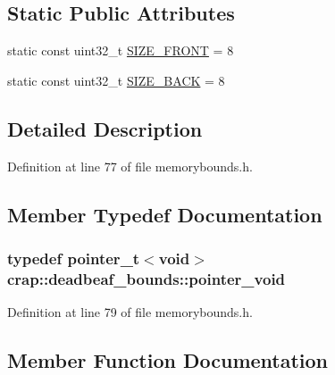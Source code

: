 \subsection*{Static Public Attributes}
\begin{DoxyCompactItemize}
\item 
static const uint32\+\_\+t \hyperlink{structcrap_1_1deadbeaf__bounds_af8de969a7504a7bc2bc13f8fc478b764}{S\+I\+Z\+E\+\_\+\+F\+R\+O\+N\+T} = 8
\item 
static const uint32\+\_\+t \hyperlink{structcrap_1_1deadbeaf__bounds_a83d1119c597f6e36b2daf83922a1ec6e}{S\+I\+Z\+E\+\_\+\+B\+A\+C\+K} = 8
\end{DoxyCompactItemize}


\subsection{Detailed Description}


Definition at line 77 of file memorybounds.\+h.



\subsection{Member Typedef Documentation}
\hypertarget{structcrap_1_1deadbeaf__bounds_ab42e3320a8d0a0039e0939887805fc32}{}
\subsubsection[{pointer\+\_\+void}]{\setlength{\rightskip}{0pt plus 5cm}typedef {\bf pointer\+\_\+t}$<$void$>$ {\bf crap\+::deadbeaf\+\_\+bounds\+::pointer\+\_\+void}}\label{structcrap_1_1deadbeaf__bounds_ab42e3320a8d0a0039e0939887805fc32}


Definition at line 79 of file memorybounds.\+h.



\subsection{Member Function Documentation}
\hypertarget{structcrap_1_1deadbeaf__bounds_ad6087771e5f72de081c551a85ad16ea6}{}
